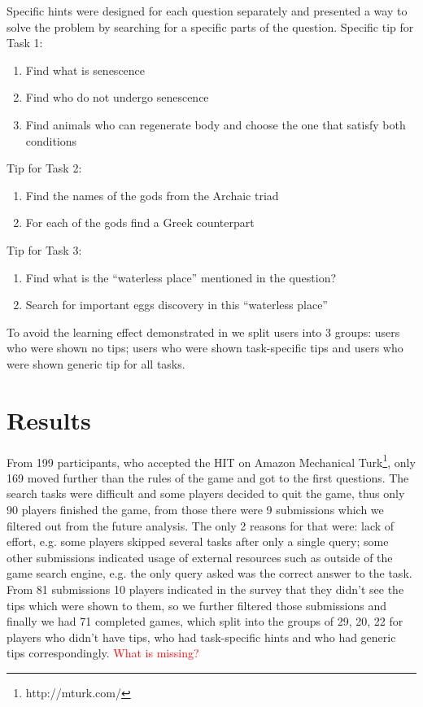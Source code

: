 \documentclass{sig-alternate}
\newcommand\todo[1]{\textcolor{red}{#1}}
\begin{document}
Specific hints were designed for each question separately and presented a way to solve the problem by searching for a specific parts of the question.
Specific tip for Task 1:
\vspace{-1mm}
\begin{enumerate} \itemsep0pt \parskip0pt 
\item Find what is senescence
\item Find who do not undergo senescence
\item Find animals who can regenerate body and choose the one that satisfy both conditions
\end{enumerate}
\vspace{-1mm}
Tip for Task 2:
\vspace{-1mm}
\begin{enumerate} \itemsep0pt \parskip0pt 
\item Find the names of the gods from the Archaic triad
\item For each of the gods find a Greek counterpart
\end{enumerate}
\vspace{-1mm}
Tip for Task 3:
\vspace{-1mm}
\begin{enumerate} \itemsep0pt \parskip0pt 
\item Find what is the ``waterless place'' mentioned in the question?
\item Search for important eggs discovery in this ``waterless place''
\end{enumerate}

To avoid the learning effect demonstrated in \cite{Moraveji:2011:MIU:2009916.2009966} we split users into 3 groups: users who were shown no tips; users who were shown task-specific tips and users who were shown generic tip for all tasks.


\section{Results}
From 199 participants, who accepted the HIT on Amazon Mechanical Turk\footnote{http://mturk.com/}, only 169 moved further than the rules of the game and got to the first questions.
The search tasks were difficult and some players decided to quit the game, thus only 90 players finished the game, from those there were 9 submissions which we filtered out from the future analysis.
The only 2 reasons for that were: lack of effort, e.g. some players skipped several tasks after only a single query; some other submissions indicated usage of external resources such as outside of the game search engine, e.g. the only query asked was the correct answer to the task.
From 81 submissions 10 players indicated in the survey that they didn't see the tips which were shown to them, so we further filtered those submissions and finally we had 71 completed games, which split into the groups of 29, 20, 22 for players who didn't have tips, who had task-specific hints and who had generic tips correspondingly.
\todo{What is missing?}
\end{document}
